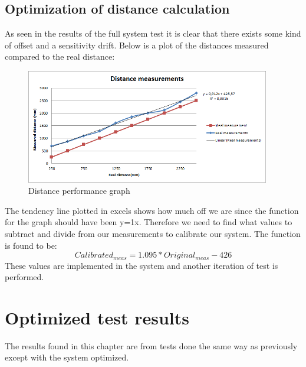 \subsection{Optimization of distance calculation}
As seen in the results of the full system test it is clear that there exists some kind of offset and a sensitivity drift. Below is a plot of the distances measured compared to the real distance:\\
\begin{figure}[H]
\centering
\includegraphics[width=0.95\textwidth]{billeder/first_test_results_graph}
\caption{Distance performance graph}
\end{figure}
The tendency line plotted in excels shows how much off we are since the function for the graph should have been y=1x. Therefore we need to find what values to subtract and divide from our measurements to calibrate our system. The function is found to be:\\
\begin{equation}
Calibrated_{meas}=1.095*Original_{meas}-426
\end{equation}
These values are implemented in the system and another iteration of test is performed.\\
\section{Optimized test results}
The results found in this chapter are from tests done the same way as previously except with the system optimized.
